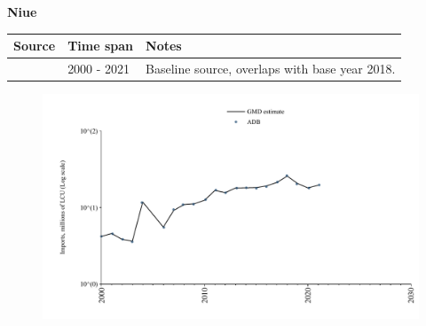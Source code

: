 \documentclass[12pt,a4paper,landscape]{article}
\begin{document}
\begin{adjustbox}{max totalsize={\paperwidth}{\paperheight},center}
\begin{minipage}[t][\textheight][t]{\textwidth}
\vspace*{0.5cm}
{}
\begin{center}
{\Large\bfseries Niue}
\end{center}
\vspace{0.5cm}
\begin{table}[H]
\centering
\small
\begin{tabular}{|l|l|l|}
\hline
\textbf{Source} & \textbf{Time span} & \textbf{Notes} \\
\hline
\rowcolor{white}\cite{ADB}& 2000 - 2021 &Baseline source, overlaps with base year 2018.\\
\hline
\end{tabular}
\end{table}
\begin{figure}[H]
\centering
\includegraphics[width=\textwidth,height=0.6\textheight,keepaspectratio]{graphs/NIU_imports.pdf}
\end{figure}
\end{minipage}
\end{adjustbox}
\end{document}
